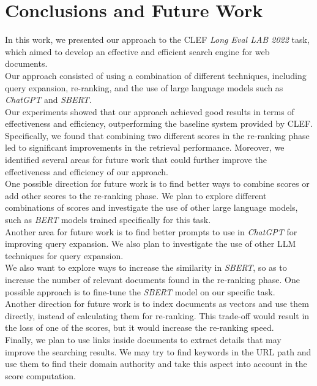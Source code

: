 \newpage
\section{Conclusions and Future Work}
\label{sec:conclusion}
 
In this work, we presented our approach to the \ac{CLEF} \textit{Long Eval LAB 2022} task, which aimed to develop an effective and efficient search engine for web documents. \\
Our approach consisted of using a combination of different techniques, including query expansion, re-ranking, and the use of large language models such as \textit{ChatGPT} and \textit{SBERT}. \\
Our experiments showed that our approach achieved good results in terms of effectiveness and efficiency, outperforming the baseline system provided by \ac{CLEF}. \\
Specifically, we found that combining two different scores in the re-ranking phase led to significant improvements in the retrieval performance. Moreover, we identified several areas for future work that could further improve the effectiveness and efficiency of our approach. \\
One possible direction for future work is to find better ways to combine scores or add other scores to the re-ranking phase. We plan to explore different combinations of scores and investigate the use of other large language models, such as \textit{BERT} models trained specifically for this task. \\
Another area for future work is to find better prompts to use in \textit{ChatGPT} for improving query expansion. We also plan to investigate the use of other \ac{LLM} techniques for query expansion. \\
We also want to explore ways to increase the similarity in \textit{SBERT}, so as to increase the number of relevant documents found in the re-ranking phase. One possible approach is to fine-tune the \textit{SBERT} model on our specific task. \\
Another direction for future work is to index documents as vectors and use them directly, instead of calculating them for re-ranking. This trade-off would result in the loss of one of the scores, but it would increase the re-ranking speed. \\
Finally, we plan to use links inside documents to extract details that may improve the searching results. We may try to find keywords in the URL path and use them to find their domain authority and take this aspect into account in the score computation.

